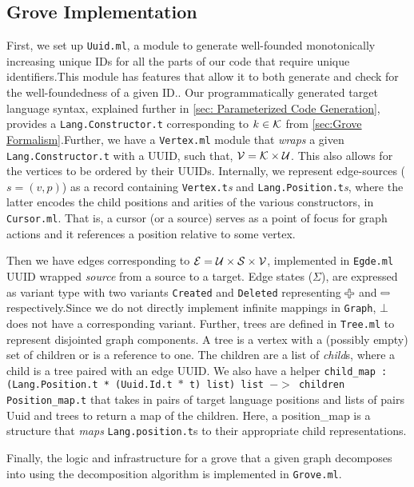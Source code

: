 \subsection{Grove Implementation}
\label{sec: Grove Implementation}

First, we set up \texttt{Uuid.ml}, a module to generate well-founded monotonically increasing unique IDs for all the parts of our code that require unique identifiers.This module has features that allow it to both generate and check for the well-foundedness of a given ID.. Our programmatically generated target language syntax, explained further in \autoref{sec: Parameterized Code Generation}, provides a \texttt{Lang.Constructor.t} corresponding to $k \in \mathcal{K}$ from \autoref{sec:Grove Formalism}.Further, we have a \texttt{Vertex.ml} module that \emph{wraps} a given \texttt{Lang.Constructor.t} with a UUID, such that, $\mathcal{V} = \mathcal{K} \times \mathcal{U}$. This also allows for the vertices to be ordered by their UUIDs. Internally, we represent edge-sources ($s = (v,p)$) as a record containing \texttt{Vertex.t}\textit{s} and \texttt{Lang.Position.t}\textit{s}, where the latter encodes the child positions and arities of the various constructors, in \texttt{Cursor.ml}. That is, a cursor (or a source) serves as a point of focus for graph actions and it references a position relative to some vertex. 

Then we have edges corresponding to $\mathcal{E} = \mathcal{U} \times \mathcal{S} \times \mathcal{V}$, implemented in \texttt{Egde.ml} UUID wrapped \emph{source} from a source to a target. Edge states ($\Sigma$), are expressed as variant type with two variants \texttt{Created} and \texttt{Deleted} representing $\Plus$ and $\Minus$ respectively.Since we do not directly implement infinite mappings in \texttt{Graph}, $\bot$ does not have a corresponding variant. Further, trees are defined in \texttt{Tree.ml} to represent disjointed graph components. A tree is a vertex with a (possibly empty) set of children or is a reference to one. The children are a list of \emph{child}s, where a child is a tree paired with an edge UUID. We also have a helper \texttt{child\_map : (Lang.Position.t * (Uuid.Id.t $*$ t) list) list $->$ children Position\_map.t} that takes in pairs of target language positions and lists of pairs Uuid and trees to return a map of the children. Here, a position\_map is a structure that \emph{maps} \texttt{Lang.position.t}s to their appropriate child representations.

Finally, the logic and infrastructure for a grove that a given graph decomposes into using the decomposition algorithm is implemented in \texttt{Grove.ml}.

